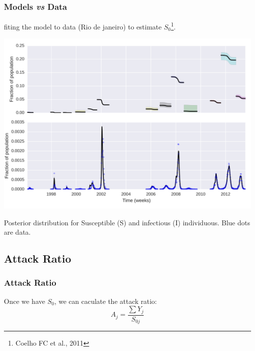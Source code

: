 \documentclass[10pt,compress,notheorems]{beamer}
\begin{document}
\begin{frame}[fragile]
\frametitle{Models \textit{vs} Data}
fiting the model to data (Rio de janeiro) to estimate $S_0$\footnote{Coelho 
FC et al., 2011}.

\includegraphics[width=\textwidth]{concat_SI.png}
 
 \begin{small}Posterior distribution for Susceptible (S) and infectious (I) 
individuous. Blue dots are data. \end{small}

\end{frame}

\subsection{Attack Ratio}
\begin{frame}
\frametitle{Attack Ratio}
Once we have $S_0$, we can caculate the attack ratio:
\begin{equation}
\label{eq:AR2}
 A_{j}=\frac{\sum Y_j}{S_{0j}}
\end{equation}
\end{frame}
\end{document}
